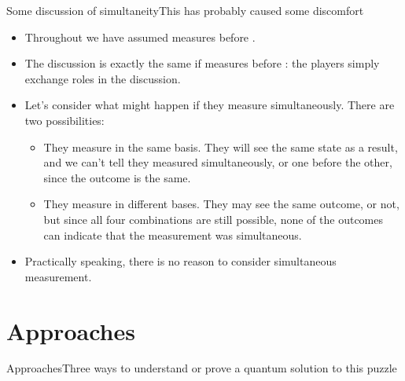 \begin{frame}{Some discussion of simultaneity}{This has probably caused some discomfort}

\begin{itemize}[<+->]
    \item Throughout we have assumed  measures before .
    \item The discussion is exactly the same if  measures before :  the players simply exchange roles in the discussion.
    \item Let's consider what might happen if they measure simultaneously.  There are two possibilities:
    \begin{itemize}
        \item They measure in the same basis.  They will see the same state as a result, and we can't tell they measured simultaneously, or one before the other, since the outcome is the same.
        \item They measure in different bases.  They may see the same outcome, or not, but since all four combinations are still possible, none of the outcomes can indicate that the measurement was simultaneous.
    \end{itemize}
    \item Practically speaking, there is no reason to consider simultaneous measurement.
\end{itemize}
    
\end{frame}



\section*{Approaches}

\begin{frame}{Approaches}{Three ways to understand or prove a quantum solution to this puzzle}


\end{frame}

